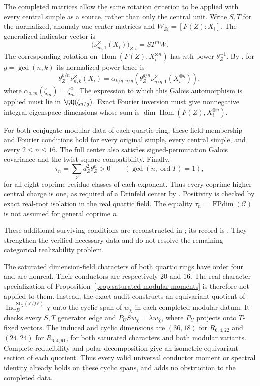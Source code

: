 The completed matrices allow the same rotation criterion to be applied
with every central simple as a source, rather than only the central
unit. Write $S,T$ for the normalized, anomaly-one center matrices and
$W_{Zi}=[F(Z):X_i]$. The generalized indicator vector is
\[
 \bigl(\nu^{Z}_{m,1}(X_i)\bigr)_{Z,i}=ST^mW.
\]
The corresponding rotation on
$\operatorname{Hom}(F(Z),X_i^{\otimes n})$ has $n$th power
$\theta_Z^{-1}$. By \cite[Propositions~3.3--3.7]{BJT}, for
$g=\gcd(n,k)$ its normalized power trace is
\[
 \theta_Z^{k/n}\nu^Z_{n,k}(X_i)
 =\alpha_{k/g,n/g}\!\left(
     \theta_Z^{g/n}\nu^Z_{n/g,1}(X_i^{\otimes g})\right),
\]
where $\alpha_{a,m}(\zeta_m)=\zeta_m^a$. The expression to which this
Galois automorphism is applied must lie in $\QQ(\zeta_{n/g})$.
Exact Fourier inversion must give nonnegative integral eigenspace
dimensions whose sum is
$\dim\operatorname{Hom}(F(Z),X_i^{\otimes n})$.

For both conjugate modular data of each quartic ring, these field
membership and Fourier conditions hold for every original simple,
every central simple, and every $2\le n\le16$. The full center also
satisfies signed-permutation Galois covariance and the twist-square
compatibility. Finally,
\[
 \tau_n=\sum_Z d_Z^2\theta_Z^n>0
 \qquad (\gcd(n,\operatorname{ord}T)=1),
\]
for all eight coprime residue classes of each exponent. Thus every
coprime higher central charge is one, as required of a Drinfeld center
by \cite[Theorem~4.4]{NSWGauss}. Positivity is checked by exact real-root
isolation in the real quartic field. The equality
$\tau_n=\operatorname{FPdim}(\mathcal C)$ is not assumed for general
coprime $n$.

These additional surviving conditions are reconstructed in
; its record is
.
They strengthen the verified necessary data and do not resolve the
remaining categorical realizability problem.


The saturated dimension-field characters of both quartic rings have order
four and are nonreal. Their conductors are respectively $20$ and $16$.
The real-character specialization of
Proposition~\ref{prop:saturated-modular-moments} is therefore not applied
to them. Instead, the exact audit
constructs an equivariant quotient of
$\operatorname{Ind}_B^{\mathrm{SL}_2(\mathbb Z/f\mathbb Z)}\chi$
onto the cyclic span of $w_\chi$ in each completed modular datum.
It checks every $S,T$ generator edge and
$P_U S w_\chi=\lambda w_{\bar\chi}$, where $P_U$ projects onto
$T$-fixed vectors. The induced and cyclic dimensions are $(36,18)$
for $R_{6,4,22}$ and $(24,24)$ for $R_{6,4,91}$, for both saturated
characters and both modular variants. Complete reducibility and polar
decomposition give an isometric equivariant section of each quotient.
Thus every valid universal conductor moment or spectral identity already
holds on these cyclic spans, and adds no obstruction to the completed data.

